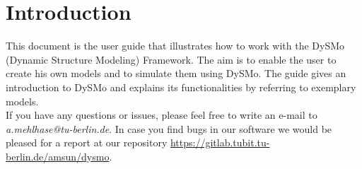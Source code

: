 \section{Introduction}
This document is the user guide that illustrates how to work with the DySMo (Dynamic Structure Modeling) Framework.
The aim is to enable the user to create his own models and to simulate them using DySMo.
The guide gives an introduction to DySMo and explains its functionalities by referring to exemplary models.
\\
If you have any questions or issues, please feel free to write an e-mail to \textit{a.mehlhase@tu-berlin.de}.
In case you find bugs in our software we would be pleased for a report at our repository \url{https://gitlab.tubit.tu-berlin.de/amsun/dysmo}.